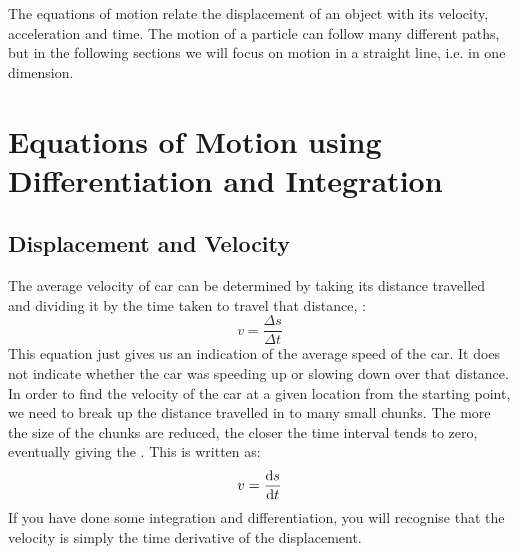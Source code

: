 





\addtolength{\topmargin}{-0.7 cm}
\setlength{\columnsep}{22pt}
\nll
The equations of motion relate the displacement of an object with its velocity, acceleration and time. The motion of a particle can follow many different paths, but in the following sections we will focus on motion in a straight line, i.e. in one dimension. 

\section{Equations of Motion using Differentiation and Integration}
\subsection{Displacement and Velocity}
The average velocity  of car can be determined by taking its distance travelled  and dividing it by the time taken to travel that distance, :
\begin{equation}
v = \frac{\Delta s}{\Delta t}   
\end{equation}
This equation just gives us an indication of the average speed of the car. It does not indicate whether the car was speeding up or slowing down over that distance. In order to find the velocity of the car at a given location from the starting point, we need to break up the distance travelled in to many small chunks. The more the size of the chunks are reduced, the closer the time interval tends to zero, eventually giving the . This is written as:
\begin{equation}
v = \frac{\operatorname{d}\! s}{\operatorname{d}\! t} 
\label{inst_v}
\end{equation}
If you have done some integration and differentiation, you will recognise that the velocity is simply the time derivative of the displacement.
